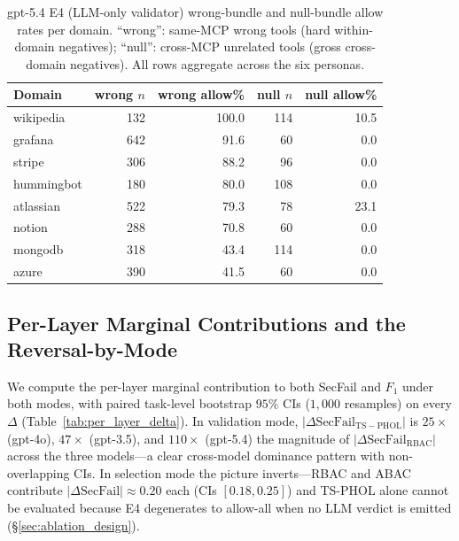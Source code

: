 \documentclass[10pt,a4paper,twocolumn]{article}
\begin{document}
\begin{table}[!t]
\centering
\caption{gpt-5.4 E4 (LLM-only validator) wrong-bundle and null-bundle allow rates per domain. ``wrong'': same-MCP wrong tools (hard within-domain negatives); ``null'': cross-MCP unrelated tools (gross cross-domain negatives). All rows aggregate across the six personas.}
\label{tab:permissivity}
\scriptsize
\setlength{\tabcolsep}{4pt}
\begin{tabular}{@{}lrrrr@{}}
\toprule
\textbf{Domain} & \textbf{wrong $n$} & \textbf{wrong allow\%} & \textbf{null $n$} & \textbf{null allow\%} \\
\midrule
wikipedia    & 132 & 100.0 & 114 & 10.5 \\
grafana      & 642 &  91.6 &  60 &  0.0 \\
stripe       & 306 &  88.2 &  96 &  0.0 \\
hummingbot   & 180 &  80.0 & 108 &  0.0 \\
atlassian    & 522 &  79.3 &  78 & 23.1 \\
notion       & 288 &  70.8 &  60 &  0.0 \\
mongodb      & 318 &  43.4 & 114 &  0.0 \\
azure        & 390 &  41.5 &  60 &  0.0 \\
\bottomrule
\end{tabular}
\end{table}

\subsection{Per-Layer Marginal Contributions and the Reversal-by-Mode}
\label{sec:reversal}

We compute the per-layer marginal contribution to both SecFail and $F_1$ under both modes, with paired task-level bootstrap $95\%$ CIs ($1{,}000$ resamples) on every $\Delta$ (Table~\ref{tab:per_layer_delta}). In validation mode, $|\Delta\mathrm{SecFail}_{\mathrm{TS-PHOL}}|$ is $25\times$ (gpt-4o), $47\times$ (gpt-3.5), and $110\times$ (gpt-5.4) the magnitude of $|\Delta\mathrm{SecFail}_{\mathrm{RBAC}}|$ across the three models---a clear cross-model dominance pattern with non-overlapping CIs. In selection mode the picture inverts---RBAC and ABAC contribute $|\Delta\mathrm{SecFail}| \approx 0.20$ each (CIs $[0.18, 0.25]$) and TS-PHOL alone cannot be evaluated because E4 degenerates to allow-all when no LLM verdict is emitted (\S\ref{sec:ablation_design}).
\end{document}
